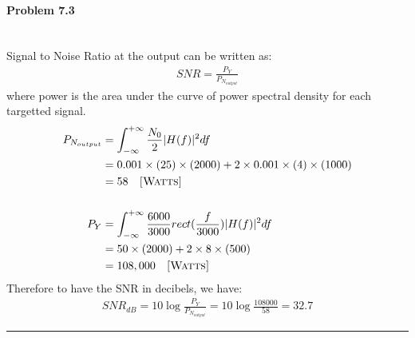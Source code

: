 \documentclass[12pt, letterpaper]{scrartcl}
\begin{document}
\paragraph*{Problem 7.3} \hfill\\
Signal to Noise Ratio at the output can be written as:
\begin{align*}
    SNR=\frac{P_{Y}}{P_{N_{output}}}
\end{align*}
where power is the area under the curve of power spectral density for each targetted signal.
\begin{align*}
    P_{N_{output}}&=\int_{-\infty}^{+\infty}\frac{N_0}{2}|H(f)|^2df\\
    &=0.001\times(25)\times(2000) + 2\times0.001\times(4)\times(1000)\\
    &=58 \quad\textsc{[Watts]}\\\\
    P_{Y}&=\int_{-\infty}^{+\infty}\frac{6000}{3000}rect(\frac{f}{3000})|H(f)|^2df\\
    &=50\times(2000) + 2\times8\times(500)\\
    &=108,000 \quad\textsc{[Watts]}
\end{align*}
Therefore to have the SNR in decibels, we have:
\begin{align*}
    SNR_{dB}=10\log\frac{P_{Y}}{P_{N_{output}}}=10\log\frac{108000}{58}=32.7
\end{align*}
\hrule
\end{document}
